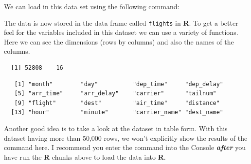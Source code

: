 \documentclass[12pt,twoside]{reedthesis}
\begin{document}
  We can load in this data set using the following command:
  
  \begin{Shaded}
  \begin{Highlighting}[]
  \StringTok{ }\NormalTok{(}\NormalTok{)}
  \end{Highlighting}
  \end{Shaded}
  
  The data is now stored in the data frame called \texttt{flights} in
  \textbf{R}. To get a better feel for the variables included in this
  dataset we can use a variety of functions. Here we can see the
  dimensions (rows by columns) and also the names of the columns.
  
  \begin{Shaded}
  \begin{Highlighting}[]
  \end{Highlighting}
  \end{Shaded}
  
  \begin{verbatim}
  [1] 52808    16
  \end{verbatim}
  
  \begin{Shaded}
  \begin{Highlighting}[]
  \end{Highlighting}
  \end{Shaded}
  
  \begin{verbatim}
   [1] "month"        "day"          "dep_time"     "dep_delay"   
   [5] "arr_time"     "arr_delay"    "carrier"      "tailnum"     
   [9] "flight"       "dest"         "air_time"     "distance"    
  [13] "hour"         "minute"       "carrier_name" "dest_name"   
  \end{verbatim}
  
  Another good idea is to take a look at the dataset in table form. With
  this dataset having more than 50,000 rows, we won't explicitly show the
  results of the command here. I recommend you enter the command into the
  Console \textbf{\emph{after}} you have run the \textbf{R} chunks above
  to load the data into \textbf{R}.
  
  \begin{Shaded}
  \begin{Highlighting}[]
  \end{Highlighting}
  \end{Shaded}
  
\end{document}
